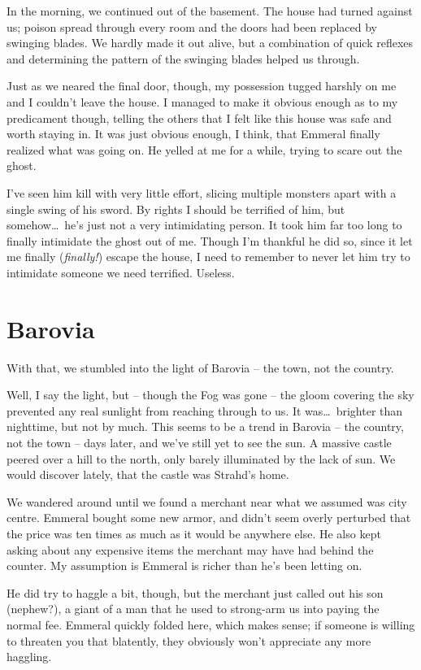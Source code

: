 
In the morning, we continued out of the basement. The house had turned against us; poison spread through every room and the doors had been replaced by swinging blades. We hardly made it out alive, but a combination of quick reflexes and determining the pattern of the swinging blades helped us through.

Just as we neared the final door, though, my possession tugged harshly on me and I couldn't leave the house. I managed to make it obvious enough as to my predicament though, telling the others that I felt like this house was safe and worth staying in. It was just obvious enough, I think, that Emmeral finally realized what was going on. He yelled at me for a while, trying to scare out the ghost.

I've seen him kill with very little effort, slicing multiple monsters apart with a single swing of his sword. By rights I should be terrified of him, but somehow\dots\ he's just not a very intimidating person. It took him far too long to finally intimidate the ghost out of me. Though I'm thankful he did so, since it let me finally (\emph{finally!}) escape the house, I need to remember to never let him try to intimidate someone we need terrified. Useless.

\section*{Barovia}
With that, we stumbled into the light of Barovia -- the town, not the country.

Well, I say the light, but -- though the Fog was gone -- the gloom covering the sky prevented any real sunlight from reaching through to us. It was\dots\ brighter than nighttime, but not by much. This seems to be a trend in Barovia -- the country, not the town -- days later, and we've still yet to see the sun. A massive castle peered over a hill to the north, only barely illuminated by the lack of sun. We would discover lately, that the castle was Strahd's home.

We wandered around until we found a merchant near what we assumed was city centre. Emmeral bought some new armor, and didn't seem overly perturbed that the price was ten times as much as it would be anywhere else. He also kept asking about any expensive items the merchant may have had behind the counter. My assumption is Emmeral is richer than he's been letting on.

He did try to haggle a bit, though, but the merchant just called out his son (nephew?), a giant of a man that he used to strong-arm us into paying the normal fee. Emmeral quickly folded here, which makes sense; if someone is willing to threaten you that blatently, they obviously won't appreciate any more haggling.

